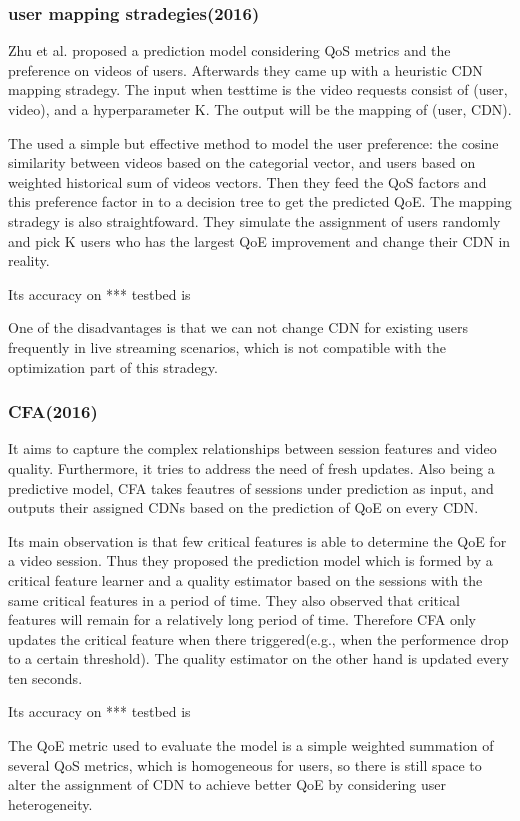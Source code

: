 \documentclass{ctexart}
\begin{document}
\subsubsection{user mapping stradegies(2016)\cite{DBLP:conf/globecom/ZhuMW016}}
\par Zhu et al. proposed a prediction model considering QoS metrics and the preference on videos of users. Afterwards they came up with a heuristic CDN mapping stradegy. The input when testtime is the video requests consist of (user, video), and a hyperparameter K. The output will be the mapping of (user, CDN).
\par The used a simple but effective method to model the user preference: the cosine similarity between videos based on the categorial vector, and users based on weighted historical sum of videos vectors. Then they feed the QoS factors and this preference factor in to a decision tree to get the predicted QoE. The mapping stradegy is also straightfoward. They simulate the assignment of users randomly and pick K users who has the largest QoE improvement and change their CDN in reality.
\par Its accuracy on *** testbed is 
\par One of the disadvantages is that we can not change CDN for existing users frequently in live streaming scenarios, which is not compatible with the optimization part of this stradegy.
\subsubsection{CFA(2016)\cite{DBLP:conf/nsdi/JiangSMSS016}}
\par It aims to capture the complex relationships between session features and video quality. Furthermore, it tries to address the need of fresh updates. Also being a predictive model, CFA takes feautres of sessions under prediction as input, and outputs their assigned CDNs based on the prediction of QoE on every CDN.
\par Its main observation is that few critical features is able to determine the QoE for a video session. Thus they proposed the prediction model which is formed by a critical feature learner and a quality estimator based on the sessions with the same critical features in a period of time. They also observed that critical features will remain for a relatively long period of time. Therefore CFA only updates the critical feature when there triggered(e.g., when the performence drop to a certain threshold). The quality estimator on the other hand is updated every ten seconds.
\par Its accuracy on *** testbed is 
\par The QoE metric used to evaluate the model is a simple weighted summation of several QoS metrics, which is homogeneous for users, so there is still space to alter the assignment of CDN to achieve better QoE by considering user heterogeneity.
\end{document}
